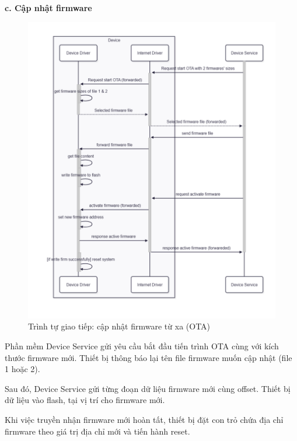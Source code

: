 \textbf{c. Cập nhật firmware}

\begin{figure}[!ht]
     \centering
    \includegraphics[width=1.0\linewidth]{Figures/Chap3_Device-firm-implementation-ota.png}
    \caption{Trình tự giao tiếp: cập nhật firmware từ xa (OTA)}
    \label{fig:hinh3.11}
\end{figure}

Phần mềm Device Service gửi yêu cầu bắt đầu tiến trình OTA cùng với kích thước firmware mới. Thiết bị thông báo lại tên file firmware muốn cập nhật (file 1 hoặc 2). 

Sau đó, Device Service gửi từng đoạn dữ liệu firmware mới cùng offset. Thiết bị dữ liệu vào flash, tại vị trí cho firmware mới.

Khi việc truyền nhận firmware mới hoàn tất, thiết bị đặt con trỏ chứa địa chỉ firmware theo giá trị địa chỉ mới và tiến hành reset.





























